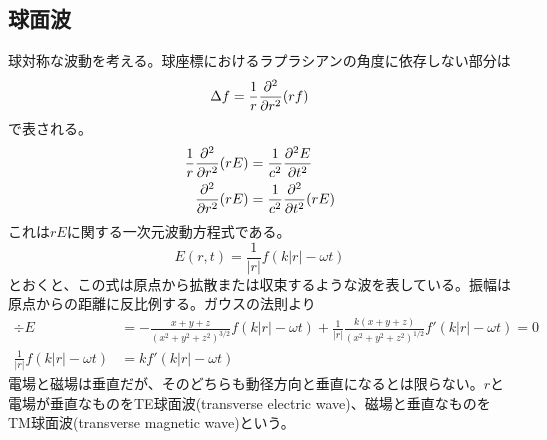\subsection{球面波}
    球対称な波動を考える。球座標におけるラプラシアンの角度に依存しない部分は
        \[\Delta f = \frac{1}{r}\pd[^2]{r^2}(rf)\]
    で表される。
    \begin{align*}
        \frac{1}{r}\pd[^2]{r^2}(rE) &= \frac{1}{c^2}\pd[^2E]{t^2}\\
        \pd[^2]{r^2}(rE) &= \frac{1}{c^2}\pd[^2]{t^2}(rE)
    \end{align*}
    これは$rE$に関する一次元波動方程式である。
        \[E(r, t) = \frac{1}{|r|}{f(k|r| - \omega t)}\]
    とおくと、この式は原点から拡散または収束するような波を表している。振幅は原点からの距離に反比例する。ガウスの法則より
    \begin{align*}
        \div E
        &= -\frac{x + y + z}{(x^2 + y^2 + z^2)^{3/2}}f(k|r| - \omega t) + \frac{1}{|r|}\frac{k(x + y + z)}{(x^2 + y^2 + z^2)^{1/2}}f'(k|r| - \omega t) = 0\\
        \frac{1}{|r|}f(k|r| - \omega t) &= kf'(k|r| - \omega t)
    \end{align*}
    電場と磁場は垂直だが、そのどちらも動径方向と垂直になるとは限らない。$r$と電場が垂直なものをTE球面波(transverse electric wave)、磁場と垂直なものをTM球面波(transverse magnetic wave)という。

